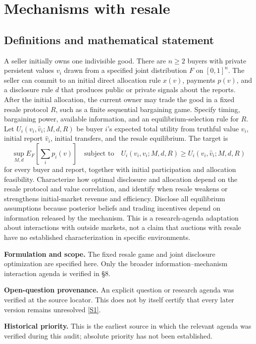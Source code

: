\documentclass[11pt]{article}
\newcommand{\sref}[2]{\hyperlink{source:#1:#2}{[S#2]}}
\begin{document}
\section*{Mechanisms with resale}\label{30007574}
\subsection{Definitions and mathematical statement}
A seller initially owns one indivisible good. There are \(n\geq2\) buyers with private persistent values \(v_i\) drawn from a specified joint distribution \(F\) on \([0,1]^n\). The seller can commit to an initial direct allocation rule \(x(v)\), payments \(p(v)\), and a disclosure rule \(d\) that produces public or private signals about the reports. After the initial allocation, the current owner may trade the good in a fixed resale protocol \(R\), such as a finite sequential bargaining game. Specify timing, bargaining power, available information, and an equilibrium-selection rule for \(R\). Let \(U_i(v_i,\widehat v_i;M,d,R)\) be buyer \(i\)'s expected total utility from truthful value \(v_i\), initial report \(\widehat v_i\), initial transfers, and the resale equilibrium. The target is
\[
 \sup_{M,d}E_F\left[\sum_i p_i(v)\right]
 \quad\text{subject to}\quad
 U_i(v_i,v_i;M,d,R)\geq U_i(v_i,\widehat v_i;M,d,R)
\]
for every buyer and report, together with initial participation and allocation feasibility. Characterize how optimal disclosure and allocation depend on the resale protocol and value correlation, and identify when resale weakens or strengthens initial-market revenue and efficiency. Disclose all equilibrium assumptions because posterior beliefs and trading incentives depend on information released by the mechanism. This is a research-agenda adaptation about interactions with outside markets, not a claim that auctions with resale have no established characterization in specific environments.

\par\textbf{Formulation and scope.} The fixed resale game and joint disclosure optimization are specified here. Only the broader information–mechanism interaction agenda is verified in §8.

\par\textbf{Open-question provenance.} An explicit question or research agenda was verified at the source locator. This does not by itself certify that every later version remains unresolved \sref{30007574}{1}.

\par\textbf{Historical priority.} This is the earliest source in which the relevant agenda was verified during this audit; absolute priority has not been established.
\end{document}
